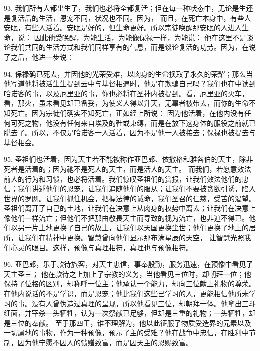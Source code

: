 93. 我们所有人都出生了，我们也必将全都复活；但在每一种状态中，无论是生还是复活后的生活，恩宠不同，状况也不同。因为，  而且，在死亡本身中，有些人安眠，有些人活着。安眠是好的，但生命更好。所以宗徒唤醒那安眠的人进入生命，说：  因此他受唤醒，为能生活，为能像保禄一样，为能说：  他在这里不是谈论我们共同的生活方式和我们同样享有的气息，而是谈论复活的功劳。因为，在说了之后，他进一步说： \par

94. 保禄确已死去，并因他的光荣受难，以肉身的生命换取了永久的荣耀；那么当他写道他将被活生生提到云中与基督相遇时，他是在欺骗自己吗？我们也在中读到哈诺客的事，以及厄里亚的事，你也必将在圣神内被提到。看，厄里亚的火车，看，那火，虽未看见却已备妥，为使义人得以升天，无辜者被带去，而你的生命不知死亡。因为宗徒们确实不知死亡，正如经上所说：  因为他活着，在他内没有任何可死之物，他没有任何来自埃及的鞋或束缚，而是在放下这身体的服役之前就已脱去了。所以，不仅是哈诺客一人活着，因为不是他一人被接去；保禄也被提去与基督相会。\par

95. 圣祖们也活着，因为天主若不能被称作亚巴郎、依撒格和雅各伯的天主，除非死者是活着的；因为祂不是死人的天主，而是活人的天主。  而我们，若愿意效法前人的行为和习惯，也必将活着。我们惊叹圣祖们的赏报，让我们效法他们的忠信；我们讲述他们的恩宠，让我们追随他们的服从；让我们不要被贪欲引诱，陷入世界的罗网。让我们抓住机会，把握法律的诫命，我们圣召的仁慈，受苦的渴望。圣祖们离开了自己的土地，让我们在决意上从肉身的权势中离去；让我们在决意上像他们一样流亡；但他们不把那由敬畏天主而导致的视为流亡，也非迫不得已。他们以另一片土地更换了自己的故土，让我们以天国更换尘世；他们更换了地上的居所，让我们在精神中更换。智慧曾向他们显示那布满星辰的天空，  让智慧光照我们心灵的眼目。这样，预像与真理相符，真理也与预像相符。\par

96. 亚巴郎，乐于款待旅客，对天主忠信，事奉殷勤，服务迅速，在预像中看见了天主圣三； 他在款待之上加上了宗教的义务，当他看见三位时，却朝拜一位；他保持了位格的区别，却称呼一位主；他承认一个能力，却向三位献上礼物的尊荣。在他内说话的不是学识，而是恩宠；他比我们这些已学习的人，更能相信他所未学习的事。没有人曾伪造过真理的呈现，所以他看见三位，却朝拜一体。他拿出三斗细面，并宰杀一头牺牲，认为一次祭献已足够，但却是三重的礼物；一头牺牲，却是三位的奉献。 至于那四王，谁不理解为，他以此征服了物质受造界的元素以及一切属地的事物，作为一种预像，预示了主的受难？他在战争中忠信，在胜利中节制，因为他宁愿不因人的馈赠致富，而是因天主的恩赐致富。\par

